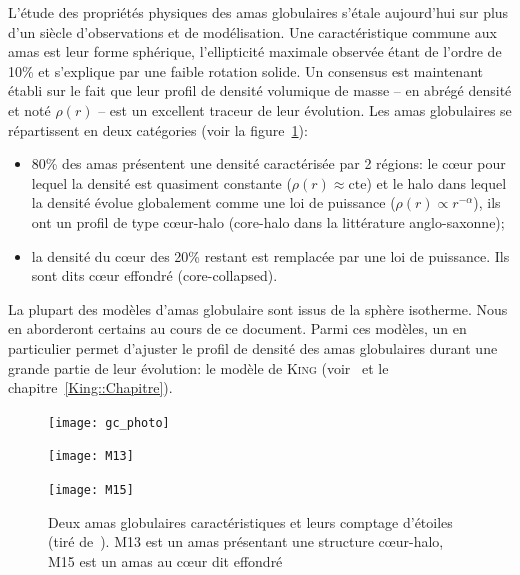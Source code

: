			L'étude des propriétés physiques des amas globulaires s'étale aujourd'hui
			sur plus d'un siècle d'observations et de modélisation. Une caractéristique
			commune aux amas est leur forme sphérique, l'ellipticité maximale observée
			étant de l'ordre de 10\% et s'explique par une faible rotation solide. Un
			consensus est maintenant établi sur le fait que leur profil de densité
			volumique de masse -- en abrégé densité et noté $\rho(r)$ -- est un excellent
			traceur de leur évolution. Les amas globulaires se répartissent en deux
			catégories (voir la figure~\ref{Fig::Intro::images}):
			\begin{itemize}
				\item 80\% des amas présentent une densité caractérisée par 2 régions:
			le cœur pour lequel la densité est quasiment constante ($\rho(r) \approx
			\mathrm{cte}$) et le halo dans lequel la densité évolue globalement comme
			une loi de puissance ($\rho(r) \propto r^{-\alpha}$), ils ont un profil de
			type cœur-halo (core-halo dans la littérature anglo-saxonne);
				\item la densité du cœur des 20\% restant est remplacée par une loi de puissance. Ils
					sont dits
			cœur effondré (core-collapsed).
			\end{itemize}

			La plupart des modèles d'amas globulaire sont issus de la sphère isotherme. Nous en
			aborderont certains au cours de ce document. Parmi ces modèles, un en particulier
			permet d'ajuster le profil de densité des amas globulaires durant une grande
			partie de leur évolution: le modèle de \textsc{King}
			(voir~\cite{1966AJ.....71...64K} et le chapitre~\ref{King::Chapitre}).

			\begin{figure}[h]
				\begin{center}
					\texttt{[image: gc\_photo]}
				\end{center}
				\begin{minipage}{0.45\textwidth}
					\begin{center}
						\texttt{[image: M13]}
					\end{center}
				\end{minipage}\hfill
				\begin{minipage}{0.45\textwidth}
					\begin{center}
						\texttt{[image: M15]}
					\end{center}
				\end{minipage}
				\caption{\label{Fig::Intro::images}Deux amas globulaires
					caractéristiques et leurs comptage d'étoiles (tiré de~\cite{2010A&A...522A..71J}).
					M13 est un amas présentant une structure cœur-halo,
					M15 est un amas au cœur dit effondré}
			\end{figure}

